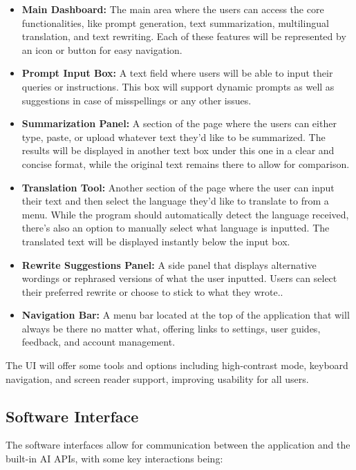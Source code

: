\documentclass{article}
\begin{document}
\begin{itemize}
    \item \textbf{Main Dashboard:} The main area where the users can access the core functionalities, like prompt generation, text summarization, multilingual translation, and text rewriting. Each of these features will be represented by an icon or button for easy navigation.
    \item \textbf{Prompt Input Box:} A text field where users will be able to input their queries or instructions. This box will support dynamic prompts as well as suggestions in case of misspellings or any other issues.
    \item \textbf{Summarization Panel:} A section of the page where the users can either type, paste, or upload whatever text they'd like to be summarized. The results will be displayed in another text box under this one in a clear and concise format, while the original text remains there to allow for comparison.
    \item \textbf{Translation Tool:} Another section of the page where the user can input their text and then select the language they'd like to translate to from a menu. While the program should automatically detect the language received, there's also an option to manually select what language is inputted. The translated text will be displayed instantly below the input box.
    \item \textbf{Rewrite Suggestions Panel:} A side panel that displays alternative wordings or rephrased versions of what the user inputted. Users can select their preferred rewrite or choose to stick to what they wrote..
    \item \textbf{Navigation Bar:} A menu bar located at the top of the application that will always be there no matter what, offering links to settings, user guides, feedback, and account management.
\end{itemize}

The UI will offer some tools and options including high-contrast mode, keyboard navigation, and screen reader support, improving usability for all users.

\subsection{Software Interface}
The software interfaces allow for communication between the application and the built-in AI APIs, with some key interactions being:
\end{document}
